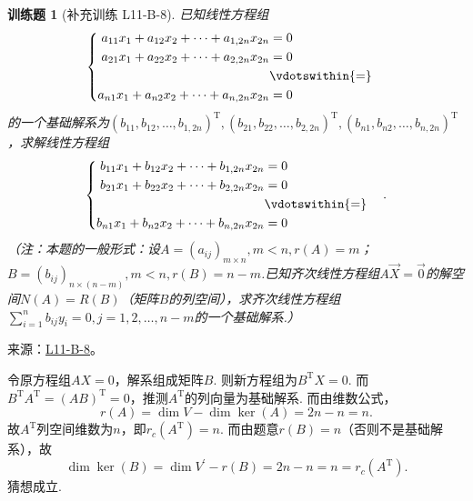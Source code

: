 \documentclass[12pt,fontset=fandol]{ctexart}
\newtheorem{exercise}{训练题}[section]
\begin{document}
\begin{exercise}[补充训练 L11-B-8]\label{prob:L11-B-8}
已知线性方程组
        \[\begin{cases} \begin{aligned}
                    a_{11}x_1+a_{12}x_2+\cdots+a_{1,2n}x_{2n} & =0              \\
                    a_{21}x_1+a_{22}x_2+\cdots+a_{2,2n}x_{2n} & =0              \\
                                                              & \vdotswithin{=} \\
                    a_{n1}x_1+a_{n2}x_2+\cdots+a_{n,2n}x_{2n} & =0              \\
                \end{aligned}\end{cases}\]
        的一个基础解系为$(b_{11},b_{12},\ldots,b_{1,2n})^\mathrm{T},(b_{21},b_{22},\ldots,b_{2,2n})^\mathrm{T},(b_{n1},b_{n2},\ldots,b_{n,2n})^\mathrm{T}$，求解线性方程组
        \[\begin{cases} \begin{aligned}
                    b_{11}x_1+b_{12}x_2+\cdots+b_{1,2n}x_{2n} & =0              \\
                    b_{21}x_1+b_{22}x_2+\cdots+b_{2,2n}x_{2n} & =0              \\
                                                              & \vdotswithin{=} \\
                    b_{n1}x_1+b_{n2}x_2+\cdots+b_{n,2n}x_{2n} & =0              \\
                \end{aligned} \end{cases}.\]
        （注：本题的一般形式：设$A=(a_{ij})_{m\times n},m<n,r(A)=m$；$B=(b_{ij})_{n\times(n-m)},m<n,r(B)=n-m$.已知齐次线性方程组$A\vec{X}=\vec{0}$的解空间$N(A)=R(B)$（矩阵$B$的列空间），求齐次线性方程组$\displaystyle\sum_{i=1}^{n}b_{ij}y_i=0,j=1,2,\ldots,n-m$的一个基础解系.）
\end{exercise}
\noindent 来源：\href{https://github.com/yhwu-is/Linear-Algebra-Left-Undone/blob/new/%E8%AE%B2%E4%B9%89/%E4%B8%93%E9%A2%98/11%20%E6%9C%9D%E8%8A%B1%E5%A4%95%E6%8B%BE.tex}{L11-B-8}。
\begin{solve}
令原方程组$AX=0$，解系组成矩阵$B$. 则新方程组为$B^\mathrm{T}X=0$. 而$B^\mathrm{T}A^\mathrm{T}=(AB)^\mathrm{T}=0$，推测$A^\mathrm{T}$的列向量为基础解系. 而由维数公式，
          \[ r(A)=\dim V-\dim\ker(A) = 2n-n=n. \]
          故$A^\mathrm{T}$列空间维数为$n$，即$r_c(A^\mathrm{T})=n$. 而由题意$r(B)=n$（否则不是基础解系），故
          \[ \dim{\ker(B)}=\dim{V^{\prime}}-r(B)=2n-n=n=r_c(A^\mathrm{T}). \]
          猜想成立.
\end{solve}
\end{document}
